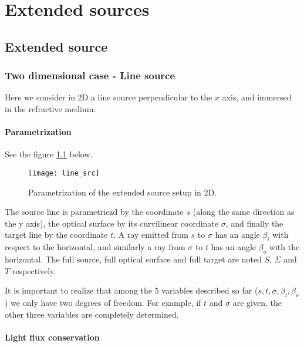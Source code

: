 \chapter{Extended sources}
\label{ch:extended}

\section{Extended source}
\subsection{Two dimensional case - Line source}
Here we consider in 2D a line source perpendicular to the $x$ axis,
and immersed in the refractive medium. 
\subsubsection*{Parametrization}
See the figure \ref{fig:line_src} below.

\begin{figure}[!htbp]
\centering
\texttt{[image: line\_src]} 
\caption{Parametrization of the extended source setup in 2D.
}
\label{fig:line_src}

\end{figure}


The source line is parametriezd by the coordinate $s$ (along the same
direction as the y axis), the optical surface 
by its curvilinear coordinate $\sigma$, and finally the target
line by the coordinate $t$.
A ray emitted from $s$ to $\sigma$ has an angle $\beta_i$ with 
respect to the horizontal, and similarly a ray from $\sigma$ to
$t$ has an angle $\beta_o$ with the horizontal.
The full source, full optical surface and full target are noted
$S$, $\Sigma$ and $T$ respectively.

It is important to realize that among the 5 variables described so
far ($s,t, \sigma, \beta_i, \beta_o$) we only have two degrees
of freedom. For example, if $t$ and $\sigma$ are given, the other
three variables are completely determined.

\subsubsection*{Light flux conservation}

